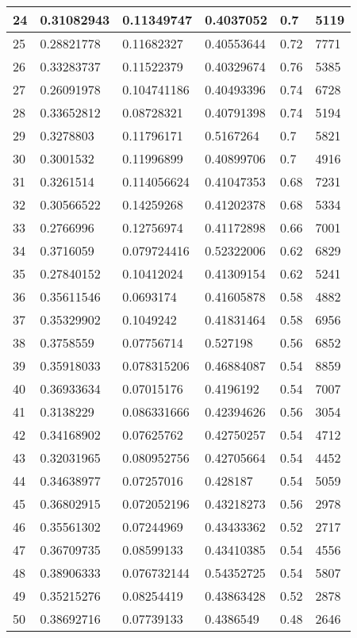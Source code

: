 \begin{longtable}{|l|l|l|l|l|l|}
24 & 0.31082943 & 0.11349747 & 0.4037052 & 0.7 & 5119 \\ \hline 
25 & 0.28821778 & 0.11682327 & 0.40553644 & 0.72 & 7771 \\ \hline 
26 & 0.33283737 & 0.11522379 & 0.40329674 & 0.76 & 5385 \\ \hline 
27 & 0.26091978 & 0.104741186 & 0.40493396 & 0.74 & 6728 \\ \hline 
28 & 0.33652812 & 0.08728321 & 0.40791398 & 0.74 & 5194 \\ \hline 
29 & 0.3278803 & 0.11796171 & 0.5167264 & 0.7 & 5821 \\ \hline 
30 & 0.3001532 & 0.11996899 & 0.40899706 & 0.7 & 4916 \\ \hline 
31 & 0.3261514 & 0.114056624 & 0.41047353 & 0.68 & 7231 \\ \hline 
32 & 0.30566522 & 0.14259268 & 0.41202378 & 0.68 & 5334 \\ \hline 
33 & 0.2766996 & 0.12756974 & 0.41172898 & 0.66 & 7001 \\ \hline 
34 & 0.3716059 & 0.079724416 & 0.52322006 & 0.62 & 6829 \\ \hline 
35 & 0.27840152 & 0.10412024 & 0.41309154 & 0.62 & 5241 \\ \hline 
36 & 0.35611546 & 0.0693174 & 0.41605878 & 0.58 & 4882 \\ \hline 
37 & 0.35329902 & 0.1049242 & 0.41831464 & 0.58 & 6956 \\ \hline 
38 & 0.3758559 & 0.07756714 & 0.527198 & 0.56 & 6852 \\ \hline 
39 & 0.35918033 & 0.078315206 & 0.46884087 & 0.54 & 8859 \\ \hline 
40 & 0.36933634 & 0.07015176 & 0.4196192 & 0.54 & 7007 \\ \hline 
41 & 0.3138229 & 0.086331666 & 0.42394626 & 0.56 & 3054 \\ \hline 
42 & 0.34168902 & 0.07625762 & 0.42750257 & 0.54 & 4712 \\ \hline 
43 & 0.32031965 & 0.080952756 & 0.42705664 & 0.54 & 4452 \\ \hline 
44 & 0.34638977 & 0.07257016 & 0.428187 & 0.54 & 5059 \\ \hline 
45 & 0.36802915 & 0.072052196 & 0.43218273 & 0.56 & 2978 \\ \hline 
46 & 0.35561302 & 0.07244969 & 0.43433362 & 0.52 & 2717 \\ \hline 
47 & 0.36709735 & 0.08599133 & 0.43410385 & 0.54 & 4556 \\ \hline 
48 & 0.38906333 & 0.076732144 & 0.54352725 & 0.54 & 5807 \\ \hline 
49 & 0.35215276 & 0.08254419 & 0.43863428 & 0.52 & 2878 \\ \hline 
50 & 0.38692716 & 0.07739133 & 0.4386549 & 0.48 & 2646 \\ \hline 
\end{longtable}